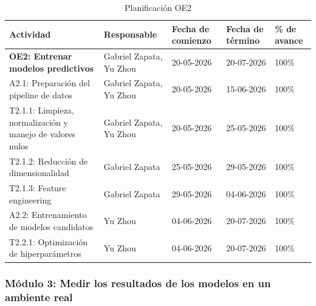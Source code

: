 \documentclass[12pt,a4paper]{article}
\begin{document}
    \begin{table}[H]
            \centering
            \renewcommand{\arraystretch}{1.5}
            \begin{tabular}{|p{5cm}|p{3cm}|p{2cm}|p{2cm}|p{2cm}|}
            \hline
            \textbf{Actividad} & \textbf{Responsable} & \textbf{Fecha de comienzo} & \textbf{Fecha de término} & \textbf{\% de avance} \\ \hline
            \textbf{OE2: Entrenar modelos predictivos} & Gabriel Zapata, Yu Zhou & 20-05-2026 & 20-07-2026 & 100\% \\ \hline
            A2.1: Preparación del pipeline de datos & Gabriel Zapata, Yu Zhou & 20-05-2026 & 15-06-2026 & 100\% \\ \hline
            T2.1.1: Limpieza, normalización y manejo de valores nulos & Gabriel Zapata, Yu Zhou & 20-05-2026 & 25-05-2026 & 100\% \\ \hline
            T2.1.2: Reducción de dimensionalidad & Gabriel Zapata & 25-05-2026 & 29-05-2026 & 100\% \\ \hline
            T2.1.3: Feature engineering & Gabriel Zapata & 29-05-2026 & 04-06-2026 & 100\% \\ \hline
            A2.2: Entrenamiento de modelos candidatos & Yu Zhou & 04-06-2026 & 20-07-2026 & 100\% \\ \hline
            T2.2.1: Optimización de hiperparámetros & Yu Zhou & 04-06-2026 & 20-07-2026 & 100\% \\ \hline
            \end{tabular}
            \caption{Planificación OE2}
            \label{tab:planificacion_avance_oe2}
    \end{table}




    \subsubsection{Módulo 3: Medir los resultados de los modelos en un ambiente real}
\end{document}
